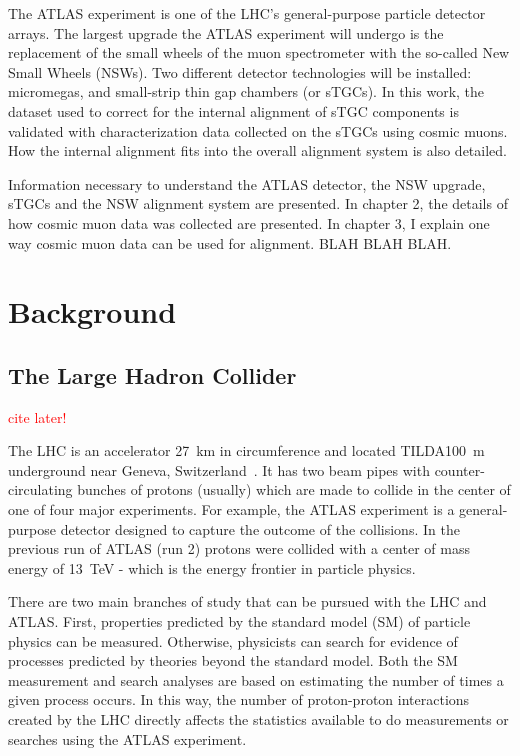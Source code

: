 The ATLAS experiment is one of the LHC's general-purpose particle detector arrays. The largest upgrade the ATLAS experiment will undergo is the replacement of the small wheels of the muon spectrometer with the so-called New Small Wheels (NSWs). Two different detector technologies will be installed: micromegas, and small-strip thin gap chambers (or sTGCs). In this work, the dataset used to correct for the internal alignment of sTGC components is validated with characterization data collected on the sTGCs using cosmic muons. How the internal alignment fits into the overall alignment system is also detailed. 

Information necessary to understand the ATLAS detector, the NSW upgrade, sTGCs and the NSW alignment system are presented. In chapter 2, the details of how cosmic muon data was collected are presented. In chapter 3, I explain one way cosmic muon data can be used for alignment. BLAH BLAH BLAH. 

\section{Background}

\subsection{The Large Hadron Collider}
\textcolor{red}{cite later!}

The LHC is an accelerator \SI{27}{\kilo\meter} in circumference and located TILDA\SI{100}{\meter} underground near Geneva, Switzerland~\cite{evans_lhc_2008}. It has two beam pipes with counter-circulating bunches of protons (usually) which are made to collide in the center of one of four major experiments. For example, the ATLAS experiment is a general-purpose detector designed to capture the outcome of the collisions. In the previous run of ATLAS (run 2) protons were collided with a center of mass energy of \SI{13}{\tera\electronvolt} - which is the energy frontier in particle physics. 

There are two main branches of study that can be pursued with the LHC and ATLAS. First, properties predicted by the standard model (SM) of particle physics can be measured. Otherwise, physicists can search for evidence of processes predicted by theories beyond the standard model. Both the SM measurement and search analyses are based on estimating the number of times a given process occurs. In this way, the number of proton-proton interactions created by the LHC directly affects the statistics available to do measurements or searches using the ATLAS experiment.

